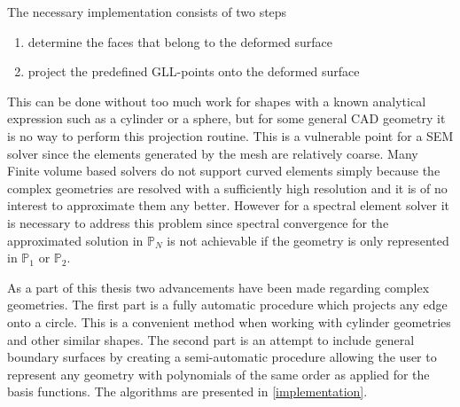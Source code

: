 The necessary implementation consists of two steps 
%
\begin{enumerate}
    \item determine the faces that belong to the deformed surface
    \item project the predefined GLL-points onto the deformed surface
\end{enumerate}
%
This can be done without too much work for shapes with a known analytical 
expression such as a cylinder or a sphere, but for some general CAD geometry 
it is no way to perform this projection routine. This is a vulnerable point 
for a SEM solver since the elements generated by the mesh are relatively coarse.
Many Finite volume based solvers do not support curved elements simply because the 
complex geometries are resolved with a sufficiently high resolution and it 
is of no interest to approximate them any better. However for a spectral element
solver it is necessary to address this problem since spectral convergence 
for the approximated solution in $\mathbb{P}_N$ is not achievable 
if the geometry is only represented in $\mathbb{P}_{1}$ or $\mathbb{P}_{2}$.

As a part of this thesis two advancements have been made regarding complex geometries. 
The first part is a fully automatic procedure which projects any edge onto a circle. This is a
convenient method when working with cylinder geometries and other similar shapes. The second part
is an attempt to include general boundary surfaces by creating a semi-automatic procedure allowing 
the user to represent any geometry with polynomials of the same order as applied for the basis functions.
The algorithms are presented in \cref{implementation}. 
